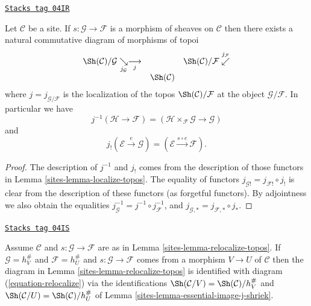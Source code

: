 \begin{lemma}
\label{sites-lemma-relocalize-topos}
\href{https://stacks.math.columbia.edu/tag/04IR}{\texttt{Stacks tag 04IR}}

Let $\mathcal{C}$ be a site.
If $s : \mathcal{G} \to \mathcal{F}$ is a morphism of sheaves
on $\mathcal{C}$ then there exists a natural commutative diagram of
morphisms of topoi
$$
\begin{array}{ccc}\Sh(\mathcal{C})/\mathcal{G} \underset{j_\mathcal{G}}{\searrow}\underset{j}{\longrightarrow} &  & \Sh(\mathcal{C})/\mathcal{F} \overset{j_\mathcal{F}}{\swarrow} \\  & \Sh(\mathcal{C}) & \end{array}
$$
where $j = j_{\mathcal{G}/\mathcal{F}}$ is the localization of the
topos $\Sh(\mathcal{C})/\mathcal{F}$ at the object
$\mathcal{G}/\mathcal{F}$. In particular we have
$$
j^{-1}(\mathcal{H} \to \mathcal{F}) =
(\mathcal{H} \times_\mathcal{F} \mathcal{G} \to \mathcal{G})
$$
and
$$
j_!(\mathcal{E} \xrightarrow{e} \mathcal{G}) =
(\mathcal{E} \xrightarrow{s \circ e} \mathcal{F}).
$$
\end{lemma}

\begin{proof}

The description of $j^{-1}$ and $j_!$ comes from the description
of those functors in
Lemma \ref{sites-lemma-localize-topos}.
The equality of functors
$j_{\mathcal{G}!} = j_{\mathcal{F}!} \circ j_!$ is clear
from the description of these functors (as forgetful functors).
By adjointness we also obtain the equalities
$j_\mathcal{G}^{-1} = j^{-1} \circ j_\mathcal{F}^{-1}$, and
$j_{\mathcal{G}, *} = j_{\mathcal{F}, *} \circ j_*$.
\end{proof}

\begin{lemma}
\label{sites-lemma-relocalize-compare}
\href{https://stacks.math.columbia.edu/tag/04IS}{\texttt{Stacks tag 04IS}}

Assume $\mathcal{C}$ and $s : \mathcal{G} \to \mathcal{F}$ are as in
Lemma \ref{sites-lemma-relocalize-topos}.
If $\mathcal{G} = h_V^\#$ and $\mathcal{F} = h_U^\#$ and
$s : \mathcal{G} \to \mathcal{F}$ comes from a morphism $V \to U$
of $\mathcal{C}$ then the diagram in
Lemma \ref{sites-lemma-relocalize-topos}
is identified with
diagram (\ref{equation-relocalize})
via the identifications
$\Sh(\mathcal{C}/V) = \Sh(\mathcal{C})/h_V^\#$
and
$\Sh(\mathcal{C}/U) = \Sh(\mathcal{C})/h_U^\#$
of
Lemma \ref{sites-lemma-essential-image-j-shriek}.
\end{lemma}

